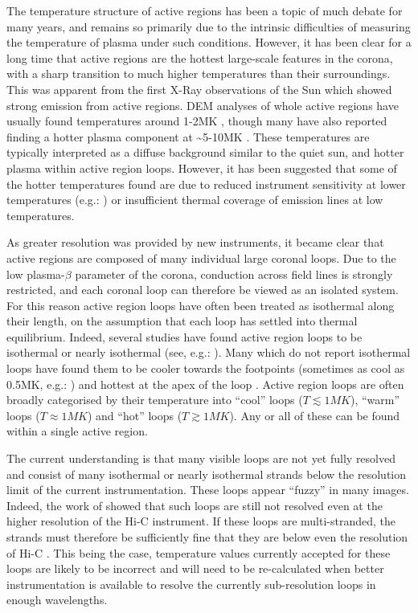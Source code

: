 \documentclass{article}
\begin{document}
The temperature structure of active regions has been a topic of much
debate for many years, and remains so primarily due to the intrinsic
difficulties of measuring the temperature of plasma under such conditions.
However, it has been clear for a long time that active regions are
the hottest large-scale features in the corona, with a sharp transition
to much higher temperatures than their surroundings. This was apparent
from the first X-Ray observations of the Sun which showed strong emission
from active regions. DEM analyses of whole active regions have usually
found temperatures around 1-2MK \citep{Brosius1996,Kashyap1998,Schmelz2009,Reale2009,Warren2009a,Goryaev2010},
though many have also reported finding a hotter plasma component at
\textasciitilde{}5-10MK \citep{Brosius1996,Kashyap1998,Schmelz2009,Reale2009}.
These temperatures are typically interpreted as a diffuse background
similar to the quiet sun, and hotter plasma within active region loops.
However, it has been suggested that some of the hotter temperatures
found are due to reduced instrument sensitivity at lower temperatures
(e.g.: \citet{Boerner2013}) or insufficient thermal coverage of emission
lines at low temperatures.

As greater resolution was provided by new instruments, it became clear
that active regions are composed of many individual large coronal
loops. Due to the low plasma-$\beta$ parameter of the corona, conduction
across field lines is strongly restricted, and each coronal loop can
therefore be viewed as an isolated system. For this reason active
region loops have often been treated as isothermal along their length,
on the assumption that each loop has settled into thermal equilibrium.
Indeed, several studies have found active region loops to be isothermal
or nearly isothermal (see, e.g.: \citet{Lenz1999,DelZanna2011,DelZanna2013}).
Many which do not report isothermal loops have found them to be cooler
towards the footpoints (sometimes as cool as 0.5MK, e.g.: \citet{DelZanna2011})
and hottest at the apex of the loop \citep{Cheng1980,Aschwanden2000,DelZanna2003}.
Active region loops are often broadly categorised by their temperature
into ``cool'' loops ($T\lesssim1MK$), ``warm'' loops ($T\approx1MK$)
and ``hot'' loops ($T\gtrsim1MK$). Any or all of these can be found
within a single active region. 

The current understanding is that many visible loops are not yet fully
resolved and consist of many isothermal or nearly isothermal strands
below the resolution limit of the current instrumentation. These loops
appear ``fuzzy'' in many images. Indeed, the work of \citet{DelZanna2013}
showed that such loops are still not resolved even at the higher resolution
of the Hi-C instrument. If these loops are multi-stranded, the strands
must therefore be sufficiently fine that they are below even the resolution
of Hi-C \citep{Cirtain2013}. This being the case, temperature values
currently accepted for these loops are likely to be incorrect and
will need to be re-calculated when better instrumentation is available
to resolve the currently sub-resolution loops in enough wavelengths. 
\end{document}
